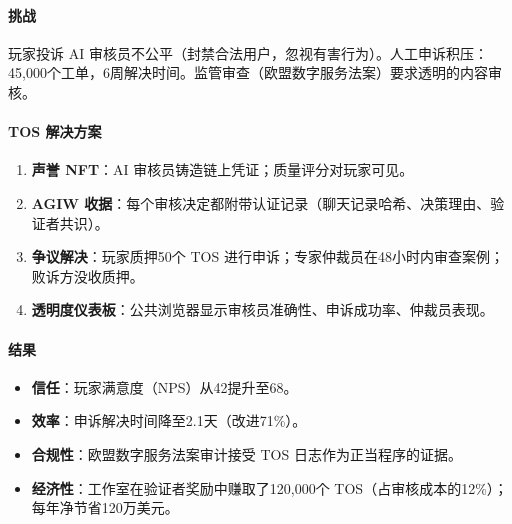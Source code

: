 \documentclass[11pt]{article}
\begin{document}
\paragraph{挑战} 玩家投诉 AI 审核员不公平（封禁合法用户，忽视有害行为）。人工申诉积压：45,000个工单，6周解决时间。监管审查（欧盟数字服务法案）要求透明的内容审核。

\paragraph{TOS 解决方案}
\begin{enumerate}[noitemsep]
  \item \textbf{声誉 NFT}：AI 审核员铸造链上凭证；质量评分对玩家可见。
  \item \textbf{AGIW 收据}：每个审核决定都附带认证记录（聊天记录哈希、决策理由、验证者共识）。
  \item \textbf{争议解决}：玩家质押50个 TOS 进行申诉；专家仲裁员在48小时内审查案例；败诉方没收质押。
  \item \textbf{透明度仪表板}：公共浏览器显示审核员准确性、申诉成功率、仲裁员表现。
\end{enumerate}

\paragraph{结果}
\begin{itemize}[noitemsep]
  \item \textbf{信任}：玩家满意度（NPS）从42提升至68。
  \item \textbf{效率}：申诉解决时间降至2.1天（改进71\%）。
  \item \textbf{合规性}：欧盟数字服务法案审计接受 TOS 日志作为正当程序的证据。
  \item \textbf{经济性}：工作室在验证者奖励中赚取了120,000个 TOS（占审核成本的12\%）；每年净节省120万美元。
\end{itemize}
\end{document}
